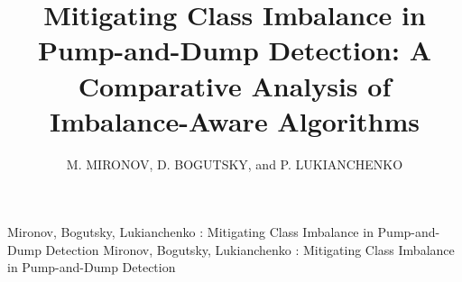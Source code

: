 \documentclass{ieeeaccess}
\begin{document}

\title{Mitigating Class Imbalance in Pump-and-Dump Detection: A Comparative Analysis of Imbalance-Aware Algorithms}
\author{\uppercase{M. Mironov},
\uppercase{D. Bogutsky}, and P. \uppercase{Lukianchenko}}

\address[1]{National Research University Higher School of Economics, Faculty of Computer Science, Laboratory of AI in Mathematical Finance (e-mail: mvmironov{@}hse.ru)}

\address[2]{National Research University Higher School of Economics, Faculty of Computer Science, Laboratory of AI in Mathematical Finance (e-mail: dbogucki{@}hse.ru)}

\address[3]{National Research University Higher School of Economics, Faculty of Computer Science, Laboratory of AI in Mathematical Finance (e-mail: plukyanchenko{@}hse.ru)}


\markboth
{Mironov, Bogutsky, Lukianchenko \headeretal: Mitigating Class Imbalance in Pump-and-Dump Detection}
{Mironov, Bogutsky, Lukianchenko \headeretal: Mitigating Class Imbalance in Pump-and-Dump Detection}

\end{document}
